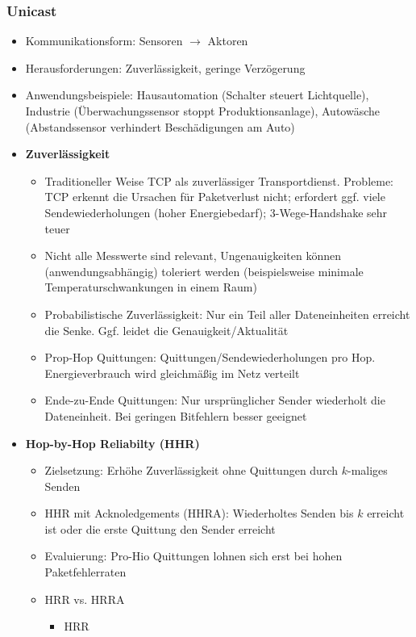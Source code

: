 \subsubsection{Unicast}
\begin{itemize}
	\item Kommunikationsform: Sensoren \(\rightarrow\) Aktoren
	\item Herausforderungen: Zuverlässigkeit, geringe Verzögerung
	\item Anwendungsbeispiele: Hausautomation (Schalter steuert Lichtquelle), Industrie (Überwachungssensor stoppt Produktionsanlage), Autowäsche (Abstandssensor verhindert Beschädigungen am Auto)
	\item \textbf{Zuverlässigkeit}
	\begin{itemize}
		\item Traditioneller Weise TCP als zuverlässiger Transportdienst. Probleme: TCP erkennt die Ursachen für Paketverlust nicht; erfordert ggf. viele Sendewiederholungen (hoher Energiebedarf); 3-Wege-Handshake sehr teuer
		\item Nicht alle Messwerte sind relevant, Ungenauigkeiten können (anwendungsabhängig) toleriert werden (beispielsweise minimale Temperaturschwankungen in einem Raum)
		\item Probabilistische Zuverlässigkeit: Nur ein Teil aller Dateneinheiten erreicht die Senke. Ggf. leidet die Genauigkeit/Aktualität
		\item Prop-Hop Quittungen: Quittungen/Sendewiederholungen pro Hop. Energieverbrauch wird gleichmäßig im Netz verteilt
		\item Ende-zu-Ende Quittungen: Nur ursprünglicher Sender wiederholt die Dateneinheit. Bei geringen Bitfehlern besser geeignet
	\end{itemize}
	\item \textbf{Hop-by-Hop Reliabilty (HHR)}
	\begin{itemize}
		\item Zielsetzung: Erhöhe Zuverlässigkeit ohne Quittungen durch \(k\)-maliges Senden
		\item HHR mit Acknoledgements (HHRA): Wiederholtes Senden bis \(k\) erreicht ist oder die erste Quittung den Sender erreicht
		\item Evaluierung: Pro-Hio Quittungen lohnen sich erst bei hohen Paketfehlerraten
		\item HRR vs. HRRA
		\begin{itemize}
			\item HRR
			\begin{itemize}

\end{itemize}
\end{itemize}
\end{itemize}
\end{itemize}
